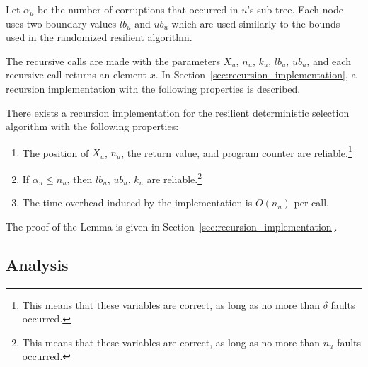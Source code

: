 \documentclass{llncs}
\begin{document}
\vspace{10mm}






Let $\alpha_u$ be the number of corruptions that occurred in $u$'s sub-tree. Each node uses two boundary values $lb_u$ and $ub_u$ which are used similarly to the bounds used in the randomized resilient algorithm.

The recursive calls are made with the parameters $X_u$, $n_u$, $k_u$, $lb_u$, $ub_u$, and each recursive call returns an element $x$. In Section~\ref{sec:recursion_implementation}, a recursion implementation with the following properties is described.

\begin{lemma}
\label{lem:recursion_lemma}
There exists a recursion implementation for the resilient deterministic selection algorithm with the following properties:
\begin{enumerate}
	\item
		The position of $X_u$, $n_u$, the return value, and program counter are reliable.\footnote{This means that these variables are correct,
		as long as no more than $\delta$ faults occurred.}
	\item 
		If $\alpha_u \leq n_u$, then $lb_u$, $ub_u$, $k_u$ are reliable.\footnote{This means that these variables are correct,
		as long as no more than $n_u$ faults occurred.}
	\item
		The time overhead induced by the implementation is $O(n_u)$ per call.
\end{enumerate}
\end{lemma}
The proof of the Lemma is given in Section~\ref{sec:recursion_implementation}.











\subsection{Analysis}
\end{document}
